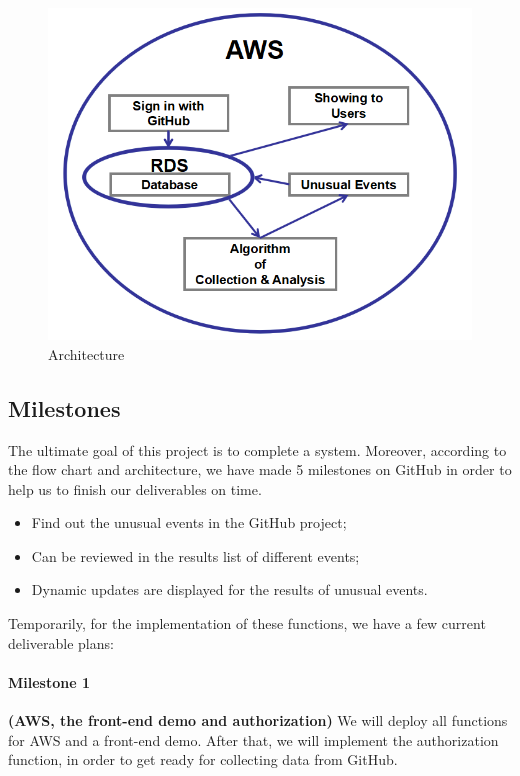 \documentclass[conference]{IEEEtran}
\begin{document}
\begin{figure}[!ht]
\centering
\includegraphics[scale=0.5]{architecture}
\caption{Architecture}
\end{figure}

\subsection{Milestones}
The ultimate goal of this project is to complete a system. Moreover, according to the flow chart and architecture, we have made 5 milestones on GitHub in order to help us to finish our deliverables on time.

\bigskip
\begin{itemize}
\item Find out the unusual events in the GitHub project;
\item Can be reviewed in the results list of different events;
\item Dynamic updates are displayed for the results of unusual events.
\end{itemize}
\bigskip
Temporarily, for the implementation of these functions, we have a few current deliverable plans:\\

\paragraph{\textbf{Milestone 1}}
\textbf{(AWS, the front-end demo and authorization)} We will deploy all functions for AWS and a front-end demo. After that, we will implement the authorization function, in order to get ready for collecting data from GitHub.\\
\end{document}
